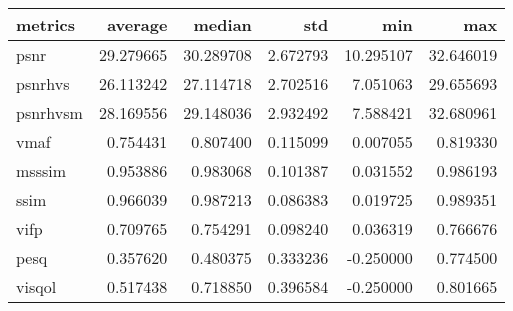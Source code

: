 \begin{tabular}{lrrrrr}
\toprule
metrics & average & median & std & min & max \\
\midrule
psnr & 29.279665 & 30.289708 & 2.672793 & 10.295107 & 32.646019 \\
psnrhvs & 26.113242 & 27.114718 & 2.702516 & 7.051063 & 29.655693 \\
psnrhvsm & 28.169556 & 29.148036 & 2.932492 & 7.588421 & 32.680961 \\
vmaf & 0.754431 & 0.807400 & 0.115099 & 0.007055 & 0.819330 \\
msssim & 0.953886 & 0.983068 & 0.101387 & 0.031552 & 0.986193 \\
ssim & 0.966039 & 0.987213 & 0.086383 & 0.019725 & 0.989351 \\
vifp & 0.709765 & 0.754291 & 0.098240 & 0.036319 & 0.766676 \\
pesq & 0.357620 & 0.480375 & 0.333236 & -0.250000 & 0.774500 \\
visqol & 0.517438 & 0.718850 & 0.396584 & -0.250000 & 0.801665 \\
\bottomrule
\end{tabular}
